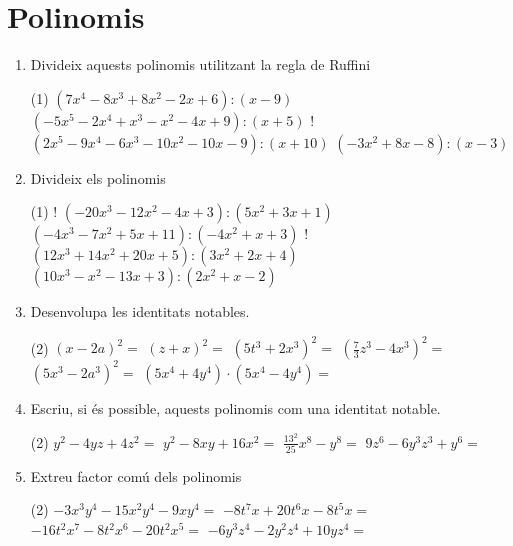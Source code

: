 \documentclass[a4paper]{article}
\begin{document}
    \section{Polinomis}
       \begin{enumerate}[resume]
      \item Divideix aquests polinomis utilitzant la regla de Ruffini
      \begin{tasks}(1)
        \task $\left(7 x^{4} -8 x^{3} + 8 x^{2} -2 x + 6\right) : \left( x -9\right)$
        \task $\left(-5 x^{5} -2 x^{4} +  x^{3} - x^{2} -4 x + 9\right) : \left( x + 5\right)$
        \task! $\left(2 x^{5} -9 x^{4} -6 x^{3} -10 x^{2} -10 x -9\right) : \left( x + 10\right)$
        \task $\left(-3 x^{2} + 8 x -8\right) : \left( x -3\right)$
      \end{tasks}
      \item Divideix els polinomis
      \begin{tasks}(1)
        \task! $\left(-20 x^{3} -12 x^{2} -4 x + 3\right) : \left(5 x^{2} + 3 x + 1\right)$
        \task $\left(-4 x^{3} -7 x^{2} + 5 x + 11\right) : \left(-4 x^{2} +  x + 3\right)$
        \task! $\left(12 x^{3} + 14 x^{2} + 20 x + 5\right) : \left(3 x^{2} + 2 x + 4\right)$
        \task $\left(10 x^{3} - x^{2} -13 x + 3\right) : \left(2 x^{2} +  x -2\right)$
      \end{tasks}
      \item Desenvolupa les identitats notables.
      \begin{tasks}(2)
        \task $\left(x - 2 a\right)^2 = {}$
        \task $\left(z + x\right)^2 = {}$
        \task $\left(5 t^{3} + 2 x^{3}\right)^2 = {}$
        \task $\left(\frac{7}{3} z^{3} - 4 x^{3}\right)^2 = {}$
        \task $\left(5 x^{3} - 2 a^{3}\right)^2 = {}$
        \task $\left(5 x^{4} + 4 y^{4}\right) \cdot \left(5 x^{4} - 4 y^{4}\right) = {}$
      \end{tasks}
      \item Escriu, si és possible, aquests polinomis com una identitat notable.
      \begin{tasks}(2)
        \task $y^{2} -4 y z +4 z^{2} = {}$
        \task $y^{2} -8 x y +16 x^{2} = {}$
        \task $\frac{13^{2}}{25} x^{8} -y^{8} = {}$
        \task $9 z^{6} -6 y^{3} z^{3} +y^{6} = {}$
      \end{tasks}
      \item Extreu factor comú dels polinomis
      \begin{tasks}(2)
        \task $-3 x^{3} y^{4} -15 x^{2} y^{4} -9 x y^{4} = {}$
        \task $-8 t^{7} x +20 t^{6} x -8 t^{5} x = {}$
        \task $-16 t^{2} x^{7} -8 t^{2} x^{6} -20 t^{2} x^{5} = {}$
        \task $-6 y^{3} z^{4} -2 y^{2} z^{4} +10 y z^{4} = {}$
      \end{tasks}
       \end{enumerate}
  
\end{document}
